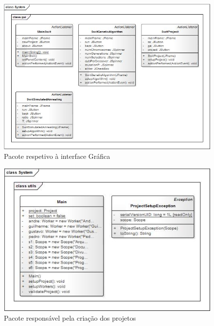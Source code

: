\documentclass[a4paper]{article}
\begin{document}
\begin{figure}
	\centering
	\includegraphics[scale=0.4]{uml3.png}
	\caption{Pacote respetivo à interface Gráfica}
\end{figure}
\begin{figure}
	\centering
	\includegraphics[scale=0.4]{uml4.png}
	\caption{Pacote responsável pela criação dos projetos}
\end{figure}
\end{document}
